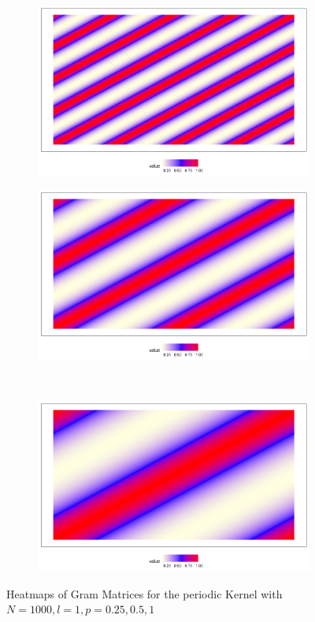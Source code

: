 \documentclass[11pt, a4paper]{article} %
\begin{document}
\begin{figure}[H]
\begin{subfigure}{.5\textwidth}
  \centering
  \includegraphics[width=.8\linewidth]{KSE_N1000_l1_p025.png}
  \label{fig:sfig1}
\end{subfigure}%
\begin{subfigure}{.5\textwidth}
  \centering
  \includegraphics[width=.8\linewidth]{KSE_N1000_l1_p05.png}
  \label{fig:sfig2}
\end{subfigure}\\
\begin{subfigure}{.5\textwidth}
  \centering
  \includegraphics[width=.8\linewidth]{KSE_N1000_l1_p1.png}
  \label{fig:sfig2}
\end{subfigure}
\caption{Heatmaps of Gram Matrices for the periodic Kernel with $N = 1000, l = 1, p = 0.25, 0.5, 1$}
\label{fig:fig}
\end{figure}
\end{document}
